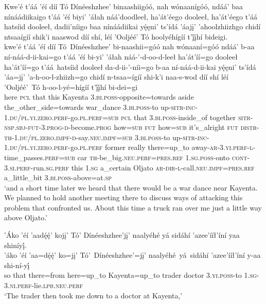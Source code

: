 \ea\label{ex:text7-7-6}
Kwe’é t’áá ’éí díí Tó Dínéeshzhee’ binaashiigóó, nah wónaanígóó, ndáá’ baa nínáádiikaigo t’áá ’éí biyi’ ’áłah náá’doodleeł, ha’át’éego dooleeł, ha’át’éego t’áá hatsíid dooleeł, dadii’níigo baa nínáádiikai yę́ęni’ ts’ídá ’áajį’ ’ahoolzhiizhgo chidí ntsaaígíí shik’i naaswod díí shí, léí ’Ooljéé’ Tó hoolyéhígíí t’į́į́hí bideigi.\\
\gll kwe’é	t’áá ’éí	díí	Tó~{Dínéeshzhee’}	bi-naashii=góó	nah	wónaaní=góó	ndáá’	b-aa	ní-náá-d-ii-kai=go	t’áá ’éí	bi-yi’	’áłah	náá-’-d-oo-d-leeł	ha’át’íí=go	dooleeł	ha’át’íí=go	t’áá~{hatsíid}	dooleeł	da-d-ii-’-níi=go	b-aa	ní-náá-d-ii-kai	yę́ęni’	ts’ídá	’áa=jį’	’a-h-oo-l-zhiizh=go	chidí	n-tsaa=ígíí	shi-k’i	naa-s-wod	díí	shí	léí	’Ooljéé’~{Tó}	h-oo-l-yé=hígíí	t’į́į́hí	bi-dei=gi\\
     here	\textsc{pcl} that	this	Kayenta	3.\textsc{bi}.\textsc{poss}-opposite=towards	aside	the\_other\_side=towards	war\_dance	3.\textsc{bi}.\textsc{poss}-to	up-\textsc{sitr}-\textsc{inc}-1.\textsc{du}/\textsc{pl}.\textsc{yi}.\textsc{zero}.\textsc{perf}-go.\textsc{pl}.\textsc{perf}=\textsc{sub}	\textsc{pcl} that	3.\textsc{bi}.\textsc{poss}-inside\_of	together	\textsc{sitr}-\textsc{nsp}.\textsc{sbj}-\textsc{fut}-3.\textsc{prog}-\textsc{d}-become.\textsc{prog}	how=\textsc{sub}	\textsc{fut}	how=\textsc{sub}	it’s\_alright	\textsc{fut}	\textsc{distr}-\textsc{th}-1.\textsc{du}/\textsc{pl}.\textsc{zero}.\textsc{impf}-\textsc{d}-say.\textsc{neu}.\textsc{impf}=\textsc{sub}	3.\textsc{bi}.\textsc{poss}-to	up-\textsc{sitr}-\textsc{inc}-1.\textsc{du}/\textsc{pl}.\textsc{yi}.\textsc{zero}.\textsc{perf}-go.\textsc{pl}.\textsc{perf}	former	really	there=up\_to	away-\textsc{ar}-3.\textsc{yi}.\textsc{perf}-\textsc{l}-time\_passes.\textsc{perf}=\textsc{sub}	car	\textsc{th}-be\_big.\textsc{neu}.\textsc{perf}=\textsc{pres}.\textsc{ref}	1.\textsc{sg}.\textsc{poss}-onto	\textsc{cont}-3.\textsc{si}.\textsc{perf}-run.\textsc{sg}.\textsc{perf}	this	1.\textsc{sg}	a\_certain	Oljato	\textsc{ar}-\textsc{dir}-\textsc{l}-call.\textsc{neu}.\textsc{impf}=\textsc{pres}.\textsc{ref}	a\_little\_bit	3.\textsc{bi}.\textsc{poss}-above=at.\textsc{sp}\\
\glt `and a short time later we heard that there would be a war dance near Kayenta. We planned to hold another meeting there to discuss ways of attacking this problem that confronted us. About this time a truck ran over me just a little way above Oljato.'
\z

\ea\label{ex:text7-8-1}
’Áko ’éí ’aadę́ę́’ kojį’ Tó’ Dínéeshzhee’jį’ naalyéhé yá sidáhí ’azee’ííł’íní yaa shiníyį́.\\
\gll ’áko	’éí	’aa=dę́ę́’	ko=jį’	Tó’~{Dínéeshzhee’=jį’}	naalyéhé~yá~{sidáhí}	’azee’ííł’íní	y-aa	shi-ní-yį́\\
     so	that	there=from	here=up\_to	Kayenta=up\_to	trader	doctor	3.\textsc{yi}.\textsc{poss}-to	1.\textsc{sg}-3.\textsc{ni}.\textsc{perf}-lie.\textsc{lpb}.\textsc{neu}.\textsc{perf}\\
\glt `The trader then took me down to a doctor at Kayenta,'
\z

